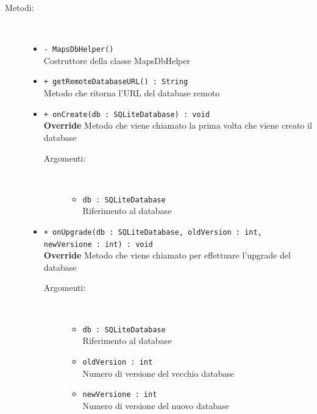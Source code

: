 \documentclass[../DefinizioneDiProdotto.tex]{subfiles}
\begin{document}
\begin{description}
\begin{itemize}
	\end{itemize}
	\item[Metodi:] \
	\begin{itemize}
		\item \texttt{- MapsDbHelper()}\\
		Costruttore della classe MapsDbHelper
		\item \texttt{+ getRemoteDatabaseURL() : String}\\
		Metodo che ritorna l'URL del database remoto
		\item \texttt{+ onCreate(db : SQLiteDatabase) : void}\\
		\textbf{Override} Metodo che viene chiamato la prima volta che viene creato il database
		\begin{description}
			\item[Argomenti:] \
			\begin{itemize}
				\item \texttt{db : SQLiteDatabase}\\
				Riferimento al database\end{itemize}
		\end{description}
		\item \texttt{+ onUpgrade(db : SQLiteDatabase, oldVersion : int, newVersione : int) : void}\\
		\textbf{Override} Metodo che viene chiamato per effettuare l'upgrade del database
		\begin{description}
			\item[Argomenti:] \
			\begin{itemize}
				\item \texttt{db : SQLiteDatabase}\\
				Riferimento al database\item \texttt{oldVersion : int}\\
				Numero di versione del vecchio database\item \texttt{newVersione : int}\\
				Numero di versione del nuovo database\end{itemize}
		\end{description}
	\end{itemize}
\end{description}
\end{document}

